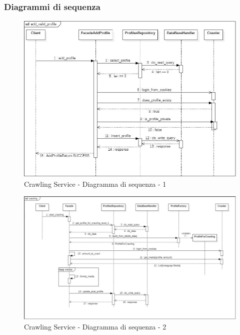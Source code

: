 \subsubsection{Diagrammi di sequenza}
\begin{figure}[!h]
    \centering
    \includegraphics[scale=0.65]{Contenuto/Immagini/seq1-CS.JPG}
    \caption{Crawling Service - Diagramma di sequenza - 1}
\end{figure}
\begin{figure}[!h]
    \centering
    \includegraphics[scale=0.35]{Contenuto/Immagini/seq2-CS.JPG}
    \caption{Crawling Service - Diagramma di sequenza - 2}
\end{figure}
